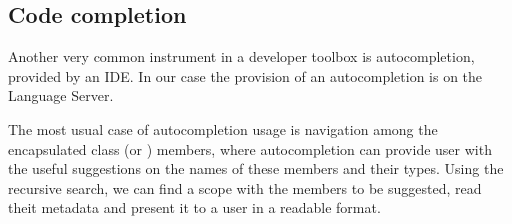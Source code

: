 \subsection{Code completion}

Another very common instrument in a developer toolbox is autocompletion, provided by an IDE.
In our case the provision of an autocompletion is on the Language Server.

The most usual case of autocompletion usage is navigation among the encapsulated class (or ) members, where autocompletion
can provide user with the useful suggestions on the names of these members and their types.
Using the recursive  search, we can find a scope with the members to be suggested, read theit metadata
and present it to a user in a readable format.



